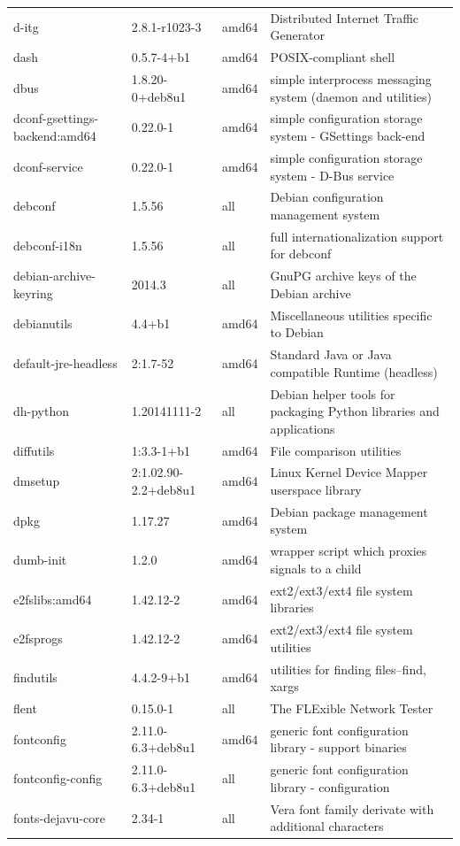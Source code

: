 \documentclass[a4paper,10pt]{article}
\begin{document}
\begin{appendices}
{\begin{longtable}{p{3.25cm}@{\hspace{0.25cm}}p{4cm}@{\hspace{0.25cm}}l@{\hspace{0.25cm}}p{7cm}}
d-itg	&	2.8.1-r1023-3	&	amd64	&	Distributed Internet Traffic Generator	\\
dash	&	0.5.7-4+b1	&	amd64	&	POSIX-compliant shell	\\
dbus	&	1.8.20-0+deb8u1	&	amd64	&	simple interprocess messaging system (daemon and utilities)	\\
dconf-gsettings-backend:amd64	&	0.22.0-1	&	amd64	&	simple configuration storage system - GSettings back-end	\\
dconf-service	&	0.22.0-1	&	amd64	&	simple configuration storage system - D-Bus service	\\
debconf	&	1.5.56	&	all	&	Debian configuration management system	\\
debconf-i18n	&	1.5.56	&	all	&	full internationalization support for debconf	\\
debian-archive-keyring	&	2014.3	&	all	&	GnuPG archive keys of the Debian archive	\\
debianutils	&	4.4+b1	&	amd64	&	Miscellaneous utilities specific to Debian	\\
default-jre-headless	&	2:1.7-52	&	amd64	&	Standard Java or Java compatible Runtime (headless)	\\
dh-python	&	1.20141111-2	&	all	&	Debian helper tools for packaging Python libraries and applications	\\
diffutils	&	1:3.3-1+b1	&	amd64	&	File comparison utilities	\\
dmsetup	&	2:1.02.90-2.2+deb8u1	&	amd64	&	Linux Kernel Device Mapper userspace library	\\
dpkg	&	1.17.27	&	amd64	&	Debian package management system	\\
dumb-init	&	1.2.0	&	amd64	&	wrapper script which proxies signals to a child	\\
e2fslibs:amd64	&	1.42.12-2	&	amd64	&	ext2/ext3/ext4 file system libraries	\\
e2fsprogs	&	1.42.12-2	&	amd64	&	ext2/ext3/ext4 file system utilities	\\
findutils	&	4.4.2-9+b1	&	amd64	&	utilities for finding files--find, xargs	\\
flent	&	0.15.0-1	&	all	&	The FLExible Network Tester	\\
fontconfig	&	2.11.0-6.3+deb8u1	&	amd64	&	generic font configuration library - support binaries	\\
fontconfig-config	&	2.11.0-6.3+deb8u1	&	all	&	generic font configuration library - configuration	\\
fonts-dejavu-core	&	2.34-1	&	all	&	Vera font family derivate with additional characters	\\

\end{longtable}}
\end{appendices}
\end{document}
